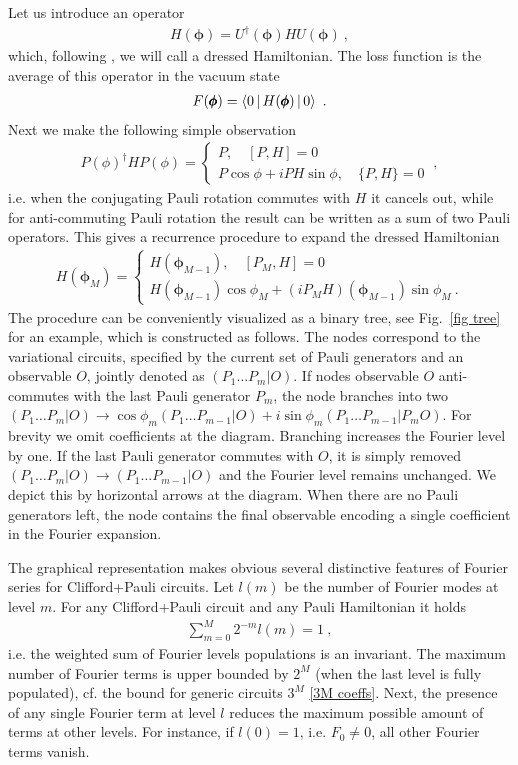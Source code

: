 \documentclass[twocolumn, amsfonts, amssymb, aps, nofootinbib]{revtex4-2}
\newcommand{\CP}{Clifford+Pauli}
\begin{document}
Let us introduce an operator
\begin{align}
	H(\pmb\phi)=U^\dagger(\pmb\phi)HU(\pmb\phi)\ ,
\end{align}
which, following \cite{Ryabinkin2020}, we will call a dressed Hamiltonian. The loss function is the average of this operator in the vacuum state
\begin{align}
	 F(\pmb\phi)=\Braket{0|H(\pmb\phi)|0} \ . \label{F from H dressed}
\end{align}
Next we make the following simple observation
\begin{align}
	P(\phi)^\dagger HP(\phi)=\begin{cases} P,\quad [P, H]=0\\ P\cos\phi+iPH\sin\phi,\quad \{P,H\}=0\end{cases} \ ,
\end{align}
i.e. when the conjugating Pauli rotation commutes with $H$ it cancels out, while for anti-commuting Pauli rotation the result can be written as a sum of two Pauli operators. This gives a recurrence procedure to expand the dressed Hamiltonian
\begin{align}
H(\pmb\phi_M)=\begin{cases} H(\pmb\phi_{M-1}),\quad [P_M, H]=0\\ H(\pmb\phi_{M-1})\cos\phi_M+(iP_MH)(\pmb\phi_{M-1})\sin\phi_M \ .\end{cases} \label{H cases}
\end{align}
The procedure can be conveniently visualized as a binary tree, see Fig.~\ref{fig tree} for an example, which is constructed as follows. The nodes correspond to the variational circuits, specified by the current set of Pauli generators and an observable $O$, jointly denoted as $(P_1\dots P_m|O)$. If nodes observable $O$ anti-commutes with the last Pauli generator $P_m$, the node branches into two $(P_1\dots P_m|O)\to\cos\phi_m (P_1\dots P_{m-1}|O)+i\sin\phi_m (P_1\dots P_{m-1}|P_m O)$. For brevity we omit coefficients at the diagram. Branching increases the Fourier level by one. If the last Pauli generator commutes with $O$, it is simply removed $(P_1\dots P_m|O)\to (P_1\dots P_{m-1}|O)$ and the Fourier level remains unchanged. We depict this by horizontal arrows at the diagram. When there are no Pauli generators left, the node contains the final observable encoding a single coefficient in the Fourier expansion.


The graphical representation makes obvious several distinctive features of Fourier series for \CP{} circuits. Let $l(m)$ be the number of Fourier modes at level $m$. For any \CP{} circuit and any Pauli Hamiltonian it holds
\begin{align}
\sum_{m=0}^M 2^{-m}l(m)=1 \ , \label{invariant}
\end{align}
i.e. the weighted sum of Fourier levels populations is an invariant. The maximum number of Fourier terms is upper bounded by $2^M$ (when the last level is fully populated), cf. the bound for generic circuits $3^M$ \eqref{3M coeffs}. Next, the presence of any single Fourier term at level $l$ reduces the maximum possible amount of terms at other levels. For instance, if $l(0)=1$, i.e. $F_0\neq0$, all other Fourier terms vanish. 
\end{document}
